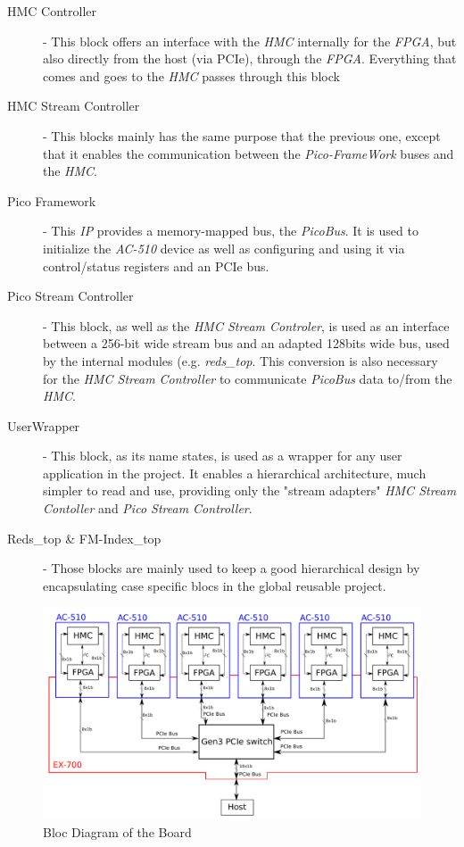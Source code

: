 \begin{description}
\item [HMC Controller] - This block offers an interface with the \textsl{HMC} internally for the \textsl{FPGA}, but also directly from the host (via PCIe), through the \textsl{FPGA}. Everything that comes and goes to the \textsl{HMC} passes through this block
\item [HMC Stream Controller ] - This blocks mainly has the same purpose that the previous one, except that it enables the communication between the \textsl{Pico-FrameWork} buses and the \textsl{HMC}.
\item [Pico Framework] - This \textsl{IP} provides a memory-mapped bus, the  \textsl{PicoBus}. It is used to initialize the \textsl{AC-510} device as well as configuring and using it via control/status registers and an PCIe bus.
\item [Pico Stream Controller] - This block, as well as the \textsl{HMC Stream Controler}, is used as an interface between a \textrm{256-bit} wide stream bus and an adapted \textrm{128bits} wide bus, used by the internal modules (e.g. \textsl{reds\_top}. This conversion is also necessary for the \textsl{HMC Stream Controller} to communicate  \textsl{PicoBus} data to/from the \textsl{HMC}.
\item [UserWrapper] - This block, as its name states, is used as a wrapper for any user application in the project. It enables a hierarchical architecture, much simpler to read and use, providing only the "stream adapters" \textsl{HMC Stream Contoller} and \textit{Pico Stream Controller}.
\item [Reds\_top \& FM-Index\_top ] - Those blocks are mainly used to keep a good hierarchical design by encapsulating case specific blocs in the global reusable project.
\end{description}


\begin{figure}[H]
    \centering
    \includegraphics[scale = 0.4]{Figures/pico_board.png}
    \caption{Bloc Diagram of the Board}
    \label{fig:board_schema}
\end{figure}

